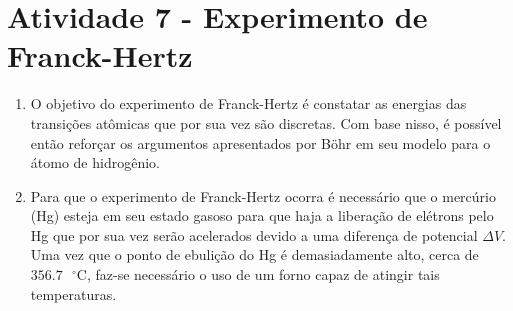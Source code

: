 \documentclass[12pt,a4paper]{article}
\begin{document}
\noindent\makebox[\linewidth]{\rule{\paperwidth}{0.4pt}}
\newpage


 
\section*{Atividade 7 - Experimento de Franck-Hertz}

\begin{enumerate}[label = \alph*)]
    \item O objetivo do experimento de Franck-Hertz é constatar as energias das transições atômicas que por sua vez são discretas. Com base nisso, é possível então reforçar os argumentos apresentados por Böhr em seu modelo para o átomo de hidrogênio.


    
    \item Para que o experimento de Franck-Hertz ocorra é necessário que o mercúrio (Hg) esteja em seu estado gasoso para que haja a liberação de elétrons pelo Hg que por sua vez serão acelerados devido a uma diferença de potencial $\Delta V$. Uma vez que o ponto de ebulição do Hg é demasiadamente alto, cerca de $356.7\text{ }^{\circ}\text{C}$, faz-se necessário o uso de um forno capaz de atingir tais temperaturas. 

    
    

\end{enumerate}
\end{document}
